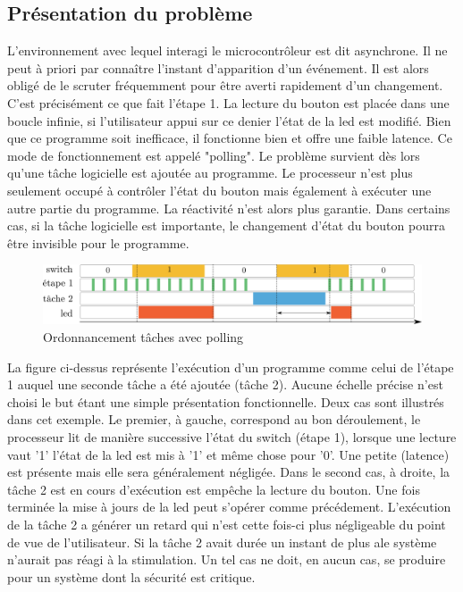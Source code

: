 \documentclass[a4paper]{article}
\begin{document}
	\subsection{Présentation du problème}
	L'environnement avec lequel interagi le microcontrôleur est dit asynchrone. Il ne peut à priori par connaître l'instant d'apparition d'un événement. Il est alors obligé de le scruter fréquemment pour être averti rapidement d'un changement. C'est précisément ce que fait l'étape 1. La lecture du bouton est placée dans une boucle infinie, si l'utilisateur appui sur ce denier l'état de la led est modifié. Bien que ce programme soit inefficace, il fonctionne bien et offre une faible latence. Ce mode de fonctionnement est appelé "polling". Le problème survient dès lors qu'une tâche logicielle est ajoutée au programme. Le processeur n'est plus seulement occupé à contrôler l'état du bouton mais également à exécuter une autre partie du programme. La réactivité n'est alors plus garantie. Dans certains cas, si la tâche logicielle est importante, le changement d'état du bouton pourra être invisible pour le programme.
	\begin{figure}[H]
		\centering
		\includegraphics[width=0.9\linewidth]{polling_task}
		\caption{Ordonnancement tâches avec polling}
	\end{figure}
	La figure ci-dessus représente l'exécution d'un programme comme celui de l'étape 1 auquel une seconde tâche a été ajoutée (tâche 2). Aucune échelle précise n'est choisi le but étant une simple présentation fonctionnelle. Deux cas sont illustrés dans cet exemple. Le premier, à gauche, correspond au bon déroulement, le processeur lit de manière successive l'état du switch (étape 1), lorsque une lecture vaut '1' l'état de la led est mis à '1' et même chose pour '0'. Une petite (latence) est présente mais elle sera généralement négligée. Dans le second cas, à droite, la tâche 2 est en cours d'exécution est empêche la lecture du bouton. Une fois terminée la mise à jours de la led peut s'opérer comme précédement. L'exécution de la tâche 2 a générer un retard qui n'est cette fois-ci plus négligeable du point de vue de l'utilisateur. Si la tâche 2 avait durée un instant de plus ale système n'aurait pas réagi à la stimulation. Un tel cas ne doit, en aucun cas, se produire pour un système dont la sécurité est critique.\\
\end{document}
